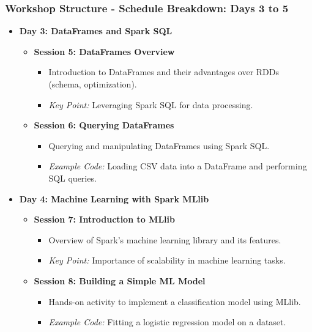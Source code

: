 \documentclass[aspectratio=169]{beamer}
\begin{document}
\begin{frame}[fragile]
    \frametitle{Workshop Structure - Schedule Breakdown: Days 3 to 5}
    \begin{itemize}
        \item \textbf{Day 3: DataFrames and Spark SQL}
        \begin{itemize}
            \item \textbf{Session 5: DataFrames Overview}
            \begin{itemize}
                \item Introduction to DataFrames and their advantages over RDDs (schema, optimization).
                \item \textit{Key Point:} Leveraging Spark SQL for data processing.
            \end{itemize}
            \item \textbf{Session 6: Querying DataFrames}
            \begin{itemize}
                \item Querying and manipulating DataFrames using Spark SQL.
                \item \textit{Example Code:} Loading CSV data into a DataFrame and performing SQL queries.
            \end{itemize}
        \end{itemize}

        \item \textbf{Day 4: Machine Learning with Spark MLlib}
        \begin{itemize}
            \item \textbf{Session 7: Introduction to MLlib}
            \begin{itemize}
                \item Overview of Spark's machine learning library and its features.
                \item \textit{Key Point:} Importance of scalability in machine learning tasks.
            \end{itemize}
            \item \textbf{Session 8: Building a Simple ML Model}
            \begin{itemize}
                \item Hands-on activity to implement a classification model using MLlib.
                \item \textit{Example Code:} Fitting a logistic regression model on a dataset.
            \end{itemize}
        \end{itemize}


\end{itemize}
\end{frame}
\end{document}
